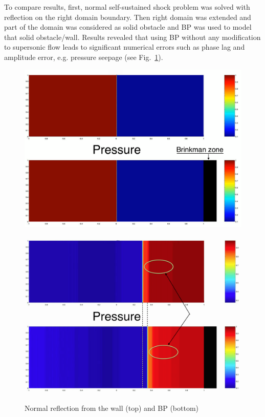 To compare results, first, normal self-sustained shock problem was solved with reflection on the right domain boundary. Then right domain was extended and part of the domain was considered as solid obstacle and BP was used to model that solid obstacle/wall. Results revealed that using BP without any modification to supersonic flow leads to significant numerical errors such as phase lag and amplitude error, e.g. pressure seepage (see Fig.~\ref{fig:plain_bp}).
\begin{figure}[h!]
\begin{minipage}{0.49\linewidth}
\includegraphics[scale=0.2]{fig/sod1_init.png}\\
\end{minipage}
\hspace{0.02\linewidth}
\begin{minipage}{0.49\linewidth}
\includegraphics[scale=0.2]{fig/sod1_end.png}\\
\end{minipage}
\caption{Normal reflection from the wall (top) and BP (bottom)} \label{fig:plain_bp}
\end{figure}

